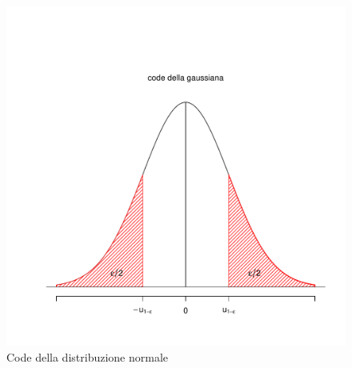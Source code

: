 \documentclass[onecolumn,12pt]{book}\usepackage[]{graphicx}\usepackage[]{color}
\makeatletter
\def\maxwidth{ %
  \ifdim\Gin@nat@width>\linewidth
    \linewidth
  \else
    \Gin@nat@width
  \fi
}
\newenvironment{knitrout}{}{} %
\makeatother
\begin{document}
\begin{figure}[H]
\begin{center}

\begin{knitrout}
\color{fgcolor}
\includegraphics[width=\maxwidth]{figure/unnamed-chunk-149-1} 

\end{knitrout}
\caption{Code della distribuzione normale}
\label{fig:normaletratto}
\end{center}
\end{figure}
\end{document}
